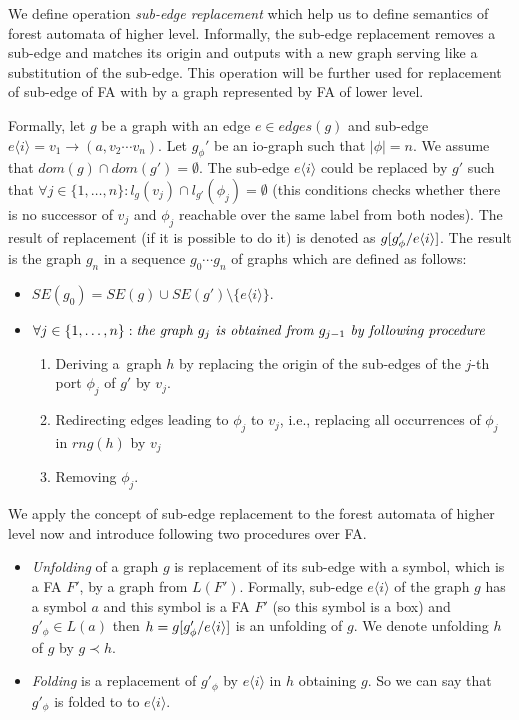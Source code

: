 We define operation \emph{sub-edge replacement} which help us to define semantics of forest automata of higher level.
Informally, the sub-edge replacement removes a sub-edge and matches its origin and outputs with a new graph serving like a substitution of the sub-edge.
This operation will be further used for replacement of sub-edge of FA with by a graph represented by FA of lower level.

Formally, let $g$ be a graph with an edge $e \in edges(g)$ and sub-edge $e\langle i\rangle = v_1 \rightarrow (a,v_2 \cdots v_n)$.
Let $g_{\phi}'$ be an io-graph such that $|\phi| = n$.
We assume that $dom(g) \cap dom(g') = \emptyset$.
The sub-edge $e\langle i\rangle$ could be replaced by $g'$ such that $\forall j \in \{1,\ldots,n\}: l_{g}(v_j) \cap
l_{g'}(\phi_j) = \emptyset$
(this conditions checks whether there is no successor of $v_j$ and $\phi_j$ reachable over the same
label from both nodes).
The result of replacement (if it is possible to do it) is denoted as $g[g'_\phi/e\langle i\rangle]$.
The result is the graph $g_n$ in a sequence $g_0 \cdots g_n$ of graphs which are defined as follows: 
\begin{itemize}
	\item $SE(g_0) = SE(g) \cup SE(g') \setminus \{e\langle i\rangle\}$.
	\item $\forall j \in \{1, \ldots, n\}: \emph{the graph } g_j \emph{ is obtained from } g_{j-1} \emph{ by following procedure }$
		\begin{enumerate}
			\item Deriving a~graph $h$ by replacing the origin of the sub-edges of the $j$-th port $\phi_j$ of $g'$ by $v_j$.
			\item Redirecting edges leading to $\phi_{j}$ to $v_j$, i.e., replacing all occurrences of $\phi_j$ in $rng(h)$ by $v_j$
			\item Removing $\phi_j$. 
		\end{enumerate}
\end{itemize}

We apply the concept of sub-edge replacement to the forest automata of higher level now
and introduce following two procedures over FA.
\begin{itemize}
	\item \emph{Unfolding} of a graph $g$ is replacement of its sub-edge with a symbol, which is
		a FA $F'$, by a graph from $L(F')$.
		Formally, sub-edge $e\langle i \rangle$ of the graph $g$ has a symbol $a$ and this symbol is a FA $F'$ (so this symbol is a box)
		and $g'_\phi \in L(a)$ then $h = g [g'_\phi/e\langle i \rangle]$ is an unfolding of $g$.
		We denote unfolding $h$ of $g$ by $g \prec h$.
	\item \emph{Folding} is a replacement of $g'_\phi$ by $e \langle i \rangle$ in $h$ obtaining $g$.
		So we can say that $g'_\phi$ is folded to to $e \langle i \rangle$. 
\end{itemize}

